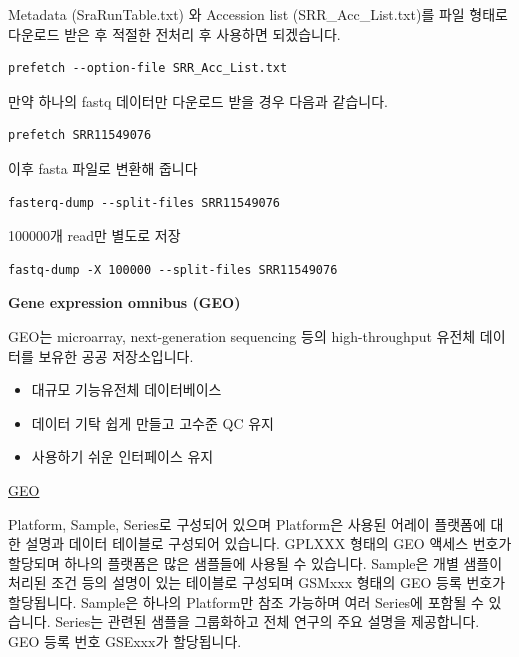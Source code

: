 \documentclass[
]{book}
\providecommand{\tightlist}{%
  \setlength{\itemsep}{0pt}\setlength{\parskip}{0pt}}
\begin{document}
Metadata (SraRunTable.txt) 와 Accession list (SRR\_Acc\_List.txt)를 파일 형태로 다운로드 받은 후 적절한 전처리 후 사용하면 되겠습니다.

\begin{verbatim}
prefetch --option-file SRR_Acc_List.txt
\end{verbatim}

만약 하나의 fastq 데이터만 다운로드 받을 경우 다음과 같습니다.

\begin{verbatim}
prefetch SRR11549076
\end{verbatim}

이후 fasta 파일로 변환해 줍니다

\begin{verbatim}
fasterq-dump --split-files SRR11549076
\end{verbatim}

100000개 read만 별도로 저장

\begin{verbatim}
fastq-dump -X 100000 --split-files SRR11549076
\end{verbatim}

\textbf{Gene expression omnibus (GEO)}

GEO는 microarray, next-generation sequencing 등의 high-throughput 유전체 데이터를 보유한 공공 저장소입니다.

\begin{itemize}
\tightlist
\item
  대규모 기능유전체 데이터베이스
\item
  데이터 기탁 쉽게 만들고 고수준 QC 유지
\item
  사용하기 쉬운 인터페이스 유지
\end{itemize}

\href{https://www.ncbi.nlm.nih.gov/geo/}{GEO}

Platform, Sample, Series로 구성되어 있으며 Platform은 사용된 어레이 플랫폼에 대한 설명과 데이터 테이블로 구성되어 있습니다. GPLXXX 형태의 GEO 액세스 번호가 할당되며 하나의 플랫폼은 많은 샘플들에 사용될 수 있습니다. Sample은 개별 샘플이 처리된 조건 등의 설명이 있는 테이블로 구성되며 GSMxxx 형태의 GEO 등록 번호가 할당됩니다. Sample은 하나의 Platform만 참조 가능하며 여러 Series에 포함될 수 있습니다. Series는 관련된 샘플을 그룹화하고 전체 연구의 주요 설명을 제공합니다. GEO 등록 번호 GSExxx가 할당됩니다.
\end{document}
